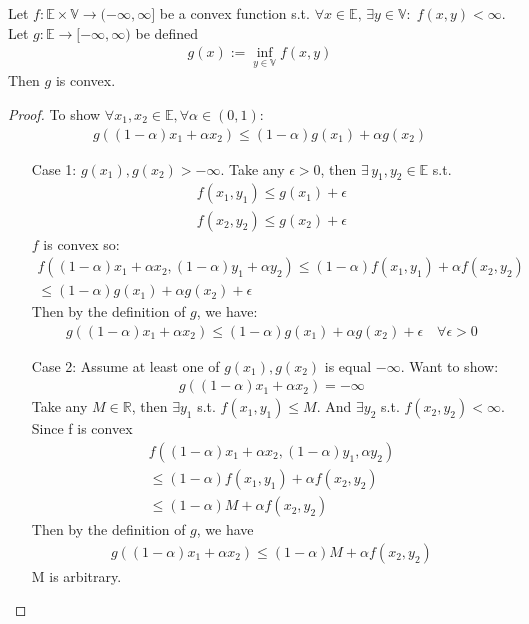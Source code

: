 \documentclass[11pt]{article}
\begin{document}
\begin{theorem} \label{thm:2.8}
    Let $f: \mathbb{E}\times \mathbb{V} \to (-\infty,\infty]$ be a convex function s.t.
    $\forall  x \in \mathbb{E}, \,\exists y \in \mathbb{V}: \; f(x,y) < \infty$.
    Let $g: \mathbb{E} \to [-\infty,\infty)$ be defined 
    \begin{align*}
        g(x) := \inf_{y \in \mathbb{V}}f(x,y)
    \end{align*}
    Then $g$ is convex.
\end{theorem}
\begin{proof}
    To show $\forall x_1,x_2 \in \mathbb{E}, \forall \alpha \in (0,1)$:
    \begin{align*}
        g((1-\alpha)x_1 + \alpha x_2) \le (1-\alpha)g(x_1) + \alpha g(x_2)
    \end{align*}
    \begin{enumerate}
        \item[Case 1:] $g(x_1),g(x_2) > -\infty$. Take any $\epsilon > 0$, then $\exists \,
        y_1,y_2 \in \mathbb{E}$ s.t.
        \begin{align*}
            f(x_1,y_1) \le g(x_1) + \epsilon\\
            f(x_2,y_2) \le g(x_2) + \epsilon
        \end{align*}
        $f$ is convex so:
        \begin{align*}
            f((1-\alpha)x_1+\alpha x_2, (1-\alpha)y_1 + \alpha y_2) \le (1-\alpha)f(x_1,y_1) + \alpha
            f(x_2,y_2) \\
            \le (1-\alpha)g(x_1) + \alpha g(x_2) + \epsilon
        \end{align*}
        Then by the definition of $g$, we have:
        \begin{align*}
            g((1-\alpha)x_1 + \alpha x_2) \le (1-\alpha)g(x_1) + \alpha g(x_2) + \epsilon
            \quad \forall \epsilon > 0
        \end{align*}
        \item[Case 2:] Assume at least one of $g(x_1), g(x_2)$ is equal $-\infty$. Want to show:
        \begin{align*}
            g((1-\alpha)x_1 + \alpha x_2) = -\infty
        \end{align*}
        Take any $M \in \mathbb{R}$, then $\exists y_1 $ s.t. $f(x_1,y_1) \le M$.
        And $\exists y_2$ s.t. $f(x_2,y_2) < \infty$. Since f is convex
        \begin{align*}
            f((1-\alpha)x_1 + \alpha x_2, (1-\alpha)y_1, \alpha y_2) \\
            \le (1-\alpha)f(x_1,y_1) + \alpha f(x_2,y_2) \\
            \le (1-\alpha)M + \alpha f(x_2,y_2)
        \end{align*}
        Then by the definition of $g$, we have
        \begin{align*}
            g((1-\alpha)x_1 + \alpha x_2) \le (1-\alpha)M + \alpha f(x_2,y_2)
        \end{align*}
        M is arbitrary.
    \end{enumerate}
\end{proof}
\end{document}

